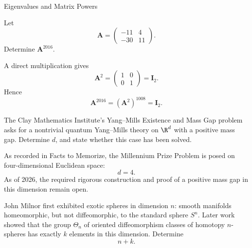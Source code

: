 \begin{expectedproblemgroup}{Eigenvalues and Matrix Powers}
        \begin{expectedsubproblem}
            Let
            \[
                \mathbf{A}
                =
                \begin{pmatrix}
                    -11 & 4\\
                    -30 & 11
                \end{pmatrix}.
            \]
            Determine $\mathbf{A}^{2016}$.
        \end{expectedsubproblem}

        \begin{expectedsubsolution}
            A direct multiplication gives
            \[
                \mathbf{A}^2
                =
                \begin{pmatrix}
                    1&0\\
                    0&1
                \end{pmatrix}
                =
                \mathbf{I}_2.
            \]
            Hence
            \[
                \mathbf{A}^{2016}
                =
                (\mathbf{A}^2)^{1008}
                =
                \boxed{\mathbf{I}_2}.
            \]
        \end{expectedsubsolution}

    \end{expectedproblemgroup}


    \begin{expectedproblem}
        The Clay Mathematics Institute's Yang--Mills Existence and Mass Gap
        problem asks for a nontrivial quantum Yang--Mills theory on
        $\R^d$ with a positive mass gap. Determine $d$, and state whether this
        case has been solved.
    \end{expectedproblem}

    \begin{solution}
        As recorded in Facts to Memorize, the Millennium Prize Problem is posed
        on four-dimensional Euclidean space:
        \[
            \boxed{d=4}.
        \]
        As of 2026, the required rigorous construction and proof of a positive
        mass gap in this dimension remain open.
    \end{solution}

    \begin{expectedproblem}
        John Milnor first exhibited exotic spheres in dimension $n$: smooth
        manifolds homeomorphic, but not diffeomorphic, to the standard sphere
        $S^n$. Later work showed that the group $\Theta_n$ of oriented
        diffeomorphism classes of homotopy $n$-spheres has exactly $k$
        elements in this dimension. Determine
        \[
            n+k.
        \]
    \end{expectedproblem}

